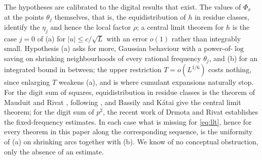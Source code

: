 \documentclass[11pt,reqno]{amsart}
\theoremstyle{plain}
\theoremstyle{definition}
\begin{document}
The hypotheses are calibrated to the digital results that exist. The values of $\Phi_x$ at the points $\theta_j$ themselves, that is, the equidistribution of $h$ in residue classes, identify the $\eta_j$ and hence the local factor $\rho$; a central limit theorem for $h$ is the case $j=0$ of (a) for $|u|\le c/\sqrt L$ with an error $o(1)$ rather than integrably small. Hypothesis (a) asks for more, Gaussian behaviour with a power-of-$\log$ saving on shrinking neighbourhoods of every rational frequency $\theta_j$, and (b) for an integrated bound in between; the upper restriction $T=o(L^{1/6})$ costs nothing, since enlarging $T$ weakens (a), and is where cumulant expansions naturally stop. For the digit sum of squares, equidistribution in residue classes is the theorem of Mauduit and Rivat \cite{mauduitrivat-squares}, following \cite{drsquares}, and Bassily and K\'atai \cite{bassilykatai} give the central limit theorem; for the digit sum of $p^{2}$, the recent work of Drmota and Rivat \cite{dr-primesquares} establishes the fixed-frequency estimates. In each case what is missing for \eqref{eq:llt}, hence for every theorem in this paper along the corresponding sequence, is the uniformity of (a) on shrinking arcs together with (b). We know of no conceptual obstruction, only the absence of an estimate.
\end{document}
